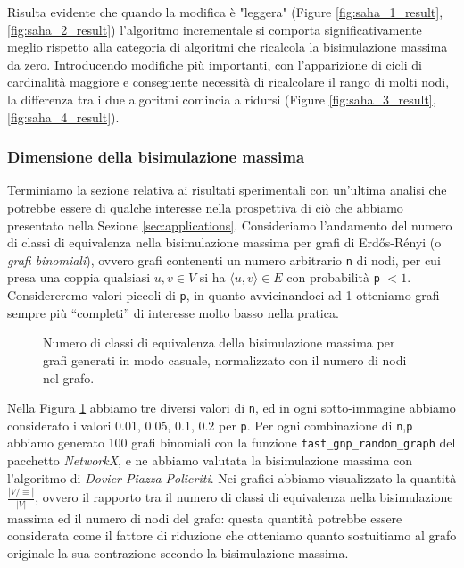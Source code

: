 Risulta evidente che quando la modifica è "leggera" (Figure \ref{fig:saha_1_result}, \ref{fig:saha_2_result}) l'algoritmo incrementale si comporta significativamente meglio rispetto alla categoria di algoritmi che ricalcola la bisimulazione massima da zero. Introducendo modifiche più importanti, con l'apparizione di cicli di cardinalità maggiore e conseguente necessità di ricalcolare il rango di molti nodi, la differenza tra i due algoritmi comincia a ridursi (Figure \ref{fig:saha_3_result}, \ref{fig:saha_4_result}).

\subsubsection{Dimensione della bisimulazione massima}
Terminiamo la sezione relativa ai risultati sperimentali con un'ultima analisi che potrebbe essere di qualche interesse nella prospettiva di ciò che abbiamo presentato nella Sezione \ref{sec:applications}. Consideriamo l'andamento del numero di classi di equivalenza nella bisimulazione massima per grafi di Erdős-Rényi (o \emph{grafi binomiali}), ovvero grafi contenenti un numero arbitrario \verb|n| di nodi, per cui presa una coppia qualsiasi $u,v \in V$ si ha $\langle u,v\rangle \in E$ con probabilità \verb|p| $< 1$.
Considereremo valori piccoli di \verb|p|, in quanto avvicinandoci ad 1 otteniamo grafi sempre più ``completi'' di interesse molto basso nella pratica.

\begin{figure}[b!]
    \caption{Numero di classi di equivalenza della bisimulazione massima per grafi generati in modo casuale, normalizzato con il numero di nodi nel grafo.}
    \label{fig:bisi_size}
\end{figure}

Nella Figura \ref{fig:bisi_size} abbiamo tre diversi valori di \verb|n|, ed in ogni sotto-immagine abbiamo considerato i valori 0.01, 0.05, 0.1, 0.2 per \verb|p|. Per ogni combinazione di \verb|n|,\verb|p| abbiamo generato 100 grafi binomiali con la funzione \verb|fast_gnp_random_graph| del pacchetto \emph{NetworkX}, e ne abbiamo valutata la bisimulazione massima con l'algoritmo di \emph{Dovier-Piazza-Policriti}. Nei grafici abbiamo visualizzato la quantità $\frac{|V / \equiv|}{|V|}$, ovvero il rapporto tra il numero di classi di equivalenza nella bisimulazione massima ed il numero di nodi del grafo: questa quantità potrebbe essere considerata come il fattore di riduzione che otteniamo quanto sostuitiamo al grafo originale la sua contrazione secondo la bisimulazione massima.

